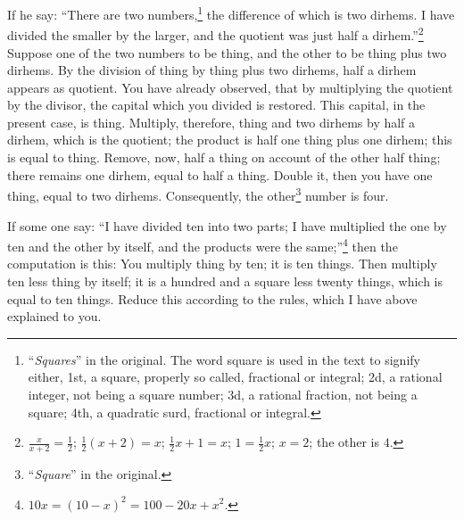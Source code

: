 If he say: ``There are two numbers,\footnote{``\textit{Squares}'' in the original. The word square is used in the text to signify either, 1st, a square, properly so called, fractional or integral; 2d, a rational integer, not being a square number; 3d, a rational fraction, not being a square; 4th, a quadratic surd, fractional or integral.} the difference of which is two dirhems. I have divided the smaller by the larger, and the quotient was just half a dirhem.''\footnote{$\frac{x}{x+2} = \frac{1}{2}$; $\frac{1}{2}(x+2) = x$; $\frac{1}{2}x + 1 = x$; $1 = \frac{1}{2}x$; $x = 2$; the other is $4$.} Suppose one of the two numbers to be thing, and the other to be thing plus two dirhems. By the division of thing by thing plus two dirhems, half a dirhem appears as quotient. You have already observed, that by multiplying the quotient by the divisor, the capital which you divided is restored. This capital, in the present case, is thing. Multiply, therefore, thing and two dirhems by half a dirhem, which is the quotient; the product is half one thing plus one dirhem; this is equal to thing. Remove, now, half a thing on account of the other half thing; there remains one dirhem, equal to half a thing. Double it, then you have one thing, equal to two dirhems. Consequently, the other\footnote{``\textit{Square}'' in the original.} number is four.

If some one say: ``I have divided ten into two parts; I have multiplied the one by ten and the other by itself, and the products were the same;''\footnote{$10x = (10-x)^2 = 100 - 20x + x^2$.} then the computation is this: You multiply thing by ten; it is ten things. Then multiply ten less thing by itself; it is a hundred and a square less twenty things, which is equal to ten things. Reduce this according to the rules, which I have above explained to you.

